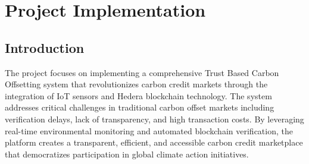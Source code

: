 \documentclass[oneside,a4paper,12pt]{book}
\begin{document}
\chapter{Project Implementation}
\newpage
  \section{Introduction}
  \begin{flushleft}
    The project focuses on implementing a comprehensive Trust Based Carbon Offsetting system that revolutionizes carbon credit markets through the integration of IoT sensors and Hedera blockchain technology. The system addresses critical challenges in traditional carbon offset markets including verification delays, lack of transparency, and high transaction costs. By leveraging real-time environmental monitoring and automated blockchain verification, the platform creates a transparent, efficient, and accessible carbon credit marketplace that democratizes participation in global climate action initiatives.
  \end{flushleft}
  
\end{document}
